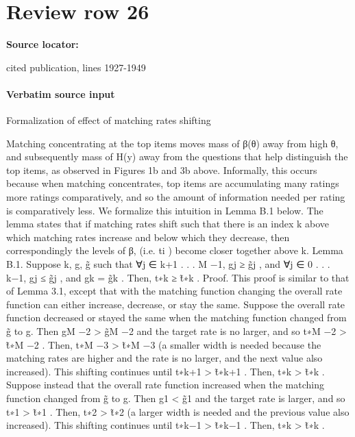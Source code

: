 \documentclass[10pt]{article}
\begin{document}
\section*{Review row 26}
\textbf{Source locator:} {\footnotesize\raggedright cited publication, lines 1927-\allowbreak{}1949\par}
\paragraph{Verbatim source input}
\begin{ReviewVerbatim}
Formalization of effect of matching rates shifting

Matching concentrating at the top items moves mass of β(θ) away from high θ, and subsequently
mass of H(y) away from the questions that help distinguish the top items, as observed in Figures 1b and 3b above. Informally, this occurs because when matching concentrates, top items are
accumulating many ratings more ratings comparatively, and so the amount of information needed
per rating is comparatively less. We formalize this intuition in Lemma B.1 below.
The lemma states that if matching rates shift such that there is an index k above which matching
rates increase and below which they decrease, then correspondingly the levels of β, (i.e. ti ) become
closer together above k.
Lemma B.1. Suppose k, g, g̃ such that ∀j ∈ {k+1 . . . M −1}, gj ≥ g̃j , and ∀j ∈ {0 . . . k−1}, gj ≤ g̃j ,
and gk = g̃k . Then, t∗k ≥ t̃∗k .
Proof. This proof is similar to that of Lemma 3.1, except that with the matching function changing
the overall rate function can either increase, decrease, or stay the same. Suppose the overall rate
function decreased or stayed the same when the matching function changed from g̃ to g. Then
gM −2 > g̃M −2 and the target rate is no larger, and so t∗M −2 > t̃∗M −2 . Then, t∗M −3 > t̃∗M −3 (a smaller
width is needed because the matching rates are higher and the rate is no larger, and the next value
also increased). This shifting continues until t∗k+1 > t̃∗k+1 . Then, t∗k > t̃∗k .
Suppose instead that the overall rate function increased when the matching function changed
from g̃ to g. Then g1 < g̃1 and the target rate is larger, and so t∗1 > t̃∗1 . Then, t∗2 > t̃∗2 (a larger
width is needed and the previous value also increased). This shifting continues until t∗k−1 > t̃∗k−1 .
Then, t∗k > t̃∗k .
\end{ReviewVerbatim}
\end{document}
